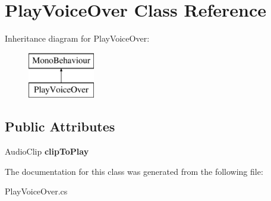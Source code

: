 \hypertarget{class_play_voice_over}{}\section{Play\+Voice\+Over Class Reference}
\label{class_play_voice_over}
Inheritance diagram for Play\+Voice\+Over\+:\begin{figure}[H]
\begin{center}
\leavevmode
\includegraphics[height=2.000000cm]{class_play_voice_over}
\end{center}
\end{figure}
\subsection*{Public Attributes}
\begin{DoxyCompactItemize}
\item 
\hypertarget{class_play_voice_over_a2431bb841b10751963bf0be23a8bd228}{}\label{class_play_voice_over_a2431bb841b10751963bf0be23a8bd228} 
Audio\+Clip {\bfseries clip\+To\+Play}
\end{DoxyCompactItemize}


The documentation for this class was generated from the following file\+:\begin{DoxyCompactItemize}
\item 
Play\+Voice\+Over.\+cs\end{DoxyCompactItemize}
